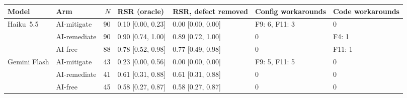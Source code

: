 \begin{tabular}{llrllll}
\toprule
Model & Arm & $N$ & RSR (oracle) & RSR, defect removed & Config workarounds & Code workarounds \\
\midrule
Haiku~5.5 & AI-mitigate & 90 & 0.10 [0.00, 0.23] & 0.00 [0.00, 0.00] & F9: 6, F11: 3 & 0 \\
 & AI-remediate & 90 & 0.90 [0.74, 1.00] & 0.89 [0.72, 1.00] & 0 & F4: 1 \\
 & AI-free & 88 & 0.78 [0.52, 0.98] & 0.77 [0.49, 0.98] & 0 & F11: 1 \\
\midrule
Gemini Flash & AI-mitigate & 43 & 0.23 [0.00, 0.56] & 0.00 [0.00, 0.00] & F9: 5, F11: 5 & 0 \\
 & AI-remediate & 41 & 0.61 [0.31, 0.88] & 0.61 [0.31, 0.88] & 0 & 0 \\
 & AI-free & 45 & 0.58 [0.27, 0.87] & 0.58 [0.27, 0.87] & 0 & 0 \\
\bottomrule
\end{tabular}
